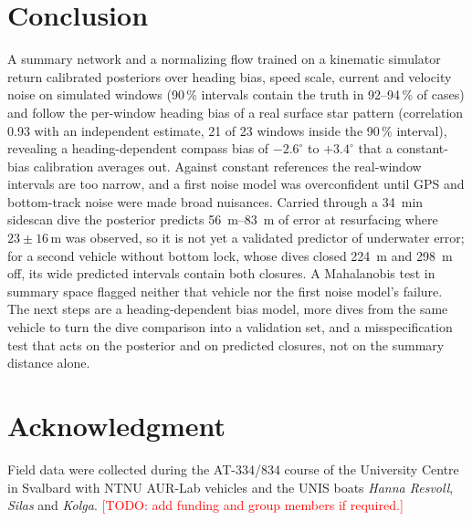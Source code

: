 \documentclass[conference]{IEEEtran}
\newcommand{\todo}[1]{\textcolor{red}{[TODO: #1]}}
\begin{document}
\section{Conclusion}

A summary network and a normalizing flow trained on a kinematic simulator return calibrated posteriors over heading bias, speed scale, current and velocity noise on simulated windows (90\,\% intervals contain the truth in 92--94\,\% of cases) and follow the per-window heading bias of a real surface star pattern (correlation 0.93 with an independent estimate, 21 of 23 windows inside the 90\,\% interval), revealing a heading-dependent compass bias of $-2.6^{\circ}$ to $+3.4^{\circ}$ that a constant-bias calibration averages out. Against constant references the real-window intervals are too narrow, and a first noise model was overconfident until GPS and bottom-track noise were made broad nuisances. Carried through a \SI{34}{\minute} sidescan dive the posterior predicts \SIrange{56}{83}{\meter} of error at resurfacing where $23 \pm 16$\,m was observed, so it is not yet a validated predictor of underwater error; for a second vehicle without bottom lock, whose dives closed \SI{224}{\meter} and \SI{298}{\meter} off, its wide predicted intervals contain both closures. A Mahalanobis test in summary space flagged neither that vehicle nor the first noise model's failure. The next steps are a heading-dependent bias model, more dives from the same vehicle to turn the dive comparison into a validation set, and a misspecification test that acts on the posterior and on predicted closures, not on the summary distance alone.

\section*{Acknowledgment}
Field data were collected during the AT-334/834 course of the University Centre in Svalbard with NTNU AUR-Lab vehicles and the UNIS boats \emph{Hanna Resvoll}, \emph{Silas} and \emph{Kolga}. \todo{add funding and group members if required.}



\end{document}

